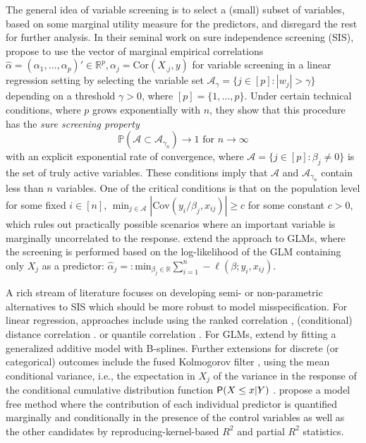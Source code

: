 \documentclass[
  article]{jss}
\begin{document}
The general idea of variable screening is to select a (small) subset of
variables, based on some marginal utility measure for the predictors,
and disregard the rest for further analysis. In their seminal work on
sure independence screening (SIS), \citet{Fan2007SISforUHD} propose to
use the vector of marginal empirical correlations
\(\hat\alpha=(\alpha_1,\ldots ,\alpha_p)'\in\mathbb{R}^p,\alpha_j=\text{Cor}(X_{.j},y)\)
for variable screening in a linear regression setting by selecting the
variable set \(\mathcal{A}_\gamma = \{j\in [p]:|w_j|>\gamma\}\)
depending on a threshold \(\gamma>0\), where \([p]=\{1,\dots,p\}\).
Under certain technical conditions, where \(p\) grows exponentially with
\(n\), they show that this procedure has the \emph{sure screening
property} \[
\mathbb{P}(\mathcal{A} \subset \mathcal{A}_{\gamma_n})\to 1 \text{ for } n\to \infty
\] with an explicit exponential rate of convergence, where
\(\mathcal{A}=\{j\in[p]:\beta_j\neq 0\}\) is the set of truly active
variables. These conditions imply that \(\mathcal{A}\) and
\(\mathcal{A}_{\gamma_n}\) contain less than \(n\) variables. One of the
critical conditions is that on the population level for some fixed
\(i\in[n]\),
\(\min_{j\in\mathcal{A}}|\text{Cov}(y_i/\beta_j,x_{ij})| \geq c\) for
some constant \(c>0\), which rules out practically possible scenarios
where an important variable is marginally uncorrelated to the response.
\citet{Fan2010sisglms} extend the approach to GLMs, where the screening
is performed based on the log-likelihood of the GLM containing only
\(X_j\) as a predictor:
\(\hat\alpha_j=: \text{min}_{{\beta_j}\in\mathbb{R}}\sum_{i=1}^n -\ell(\beta;y_i,x_{ij})\).

A rich stream of literature focuses on developing semi- or
non-parametric alternatives to SIS which should be more robust to model
misspecification. For linear regression, approaches include using the
ranked correlation \citep{zhu2011model}, (conditional) distance
correlation \citep{li2012feature, wang2015conditional}. or quantile
correlation \citep{ma2016robust}. For GLMs, \citet{fan2011nonparametric}
extend \citet{Fan2010sisglms} by fitting a generalized additive model
with B-splines. Further extensions for discrete (or categorical)
outcomes include the fused Kolmogorov filter \citep{mai2013kolmogorov},
using the mean conditional variance, i.e., the expectation in \(X_j\) of
the variance in the response of the conditional cumulative distribution
function \(\mathsf{P}(X\leq x|Y)\) \citep{cui2015model}.
\citet{ke2023sufficient} propose a model free method where the
contribution of each individual predictor is quantified marginally and
conditionally in the presence of the control variables as well as the
other candidates by reproducing-kernel-based \(R^2\) and partial \(R^2\)
statistics.
\end{document}
